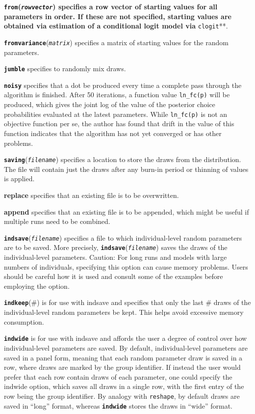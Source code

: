 \documentclass[11pt]{article}
\begin{document}
\textbf{\texttt{from}(\emph{\texttt{rowvector}}) specifies a row vector
of starting values for all parameters in order. If these are not
specified, starting values are obtained via estimation of a conditional
logit model via }\texttt{clogit}**.

\textbf{\texttt{fromvariance}}(\emph{\texttt{matrix}}) specifies a
matrix of starting values for the random parameters.

\textbf{\texttt{jumble}} specifies to randomly mix draws.

\textbf{\texttt{noisy}} specifies that a dot be produced every time a
complete pass through the algorithm is finished. After 50 iterations, a
function value \texttt{ln\_fc(p)} will be produced, which gives the
joint log of the value of the posterior choice probabilities evaluated
at the latest parameters. While \texttt{ln\_fc(p)} is not an objective
function per se, the author has found that drift in the value of this
function indicates that the algorithm has not yet converged or has other
problems.

\textbf{\texttt{saving}}(\emph{\texttt{filename}}) specifies a location
to store the draws from the distribution. The file will contain just the
draws after any burn-in period or thinning of values is applied.

\textbf{replace} specifies that an existing file is to be overwritten.

\textbf{append} specifies that an existing file is to be appended, which
might be useful if multiple runs need to be combined.

\textbf{\texttt{indsave}}(\emph{\texttt{filename}}) specifies a file to
which individual-level random parameters are to be saved. More
precisely, \textbf{\texttt{indsave}}(\emph{\texttt{filename}}) saves the
draws of the individual-level parameters. Caution: For long runs and
models with large numbers of individuals, specifying this option can
cause memory problems. Users should be careful how it is used and
consult some of the examples before employing the option.

\textbf{\texttt{indkeep}}(\#) is for use with indsave and specifies that
only the last \# draws of the individual-level random parameters be
kept. This helps avoid excessive memory consumption.

\textbf{\texttt{indwide}} is for use with indsave and affords the user a
degree of control over how individual-level parameters are saved. By
default, individual-level parameters are saved in a panel form, meaning
that each random parameter draw is saved in a row, where draws are
marked by the group identifier. If instead the user would prefer that
each row contain draws of each parameter, one could specify the indwide
option, which saves all draws in a single row, with the first entry of
the row being the group identifier. By analogy with \texttt{reshape}, by
default draws are saved in ``long'' format, whereas
\textbf{\texttt{indwide}} stores the draws in ``wide'' format.
\end{document}
